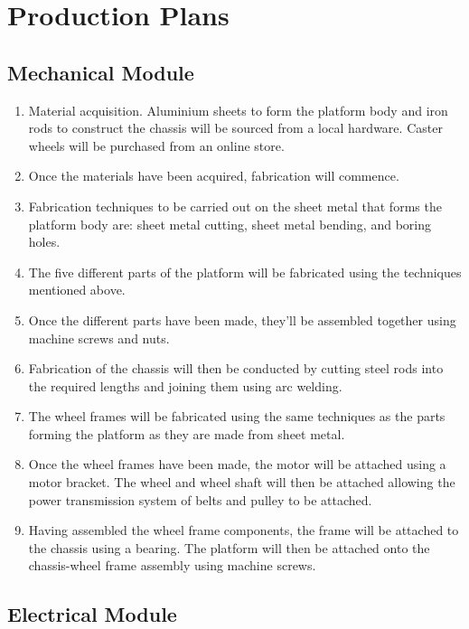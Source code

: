 \section{Production Plans}

\subsection{Mechanical Module}

\begin{enumerate}
    \item Material acquisition. Aluminium sheets to form the platform body and iron rods to construct the chassis will be sourced from a local hardware. Caster wheels will be purchased from an online store.
    \item Once the materials have been acquired, fabrication will commence.
    \item Fabrication techniques to be carried out on the sheet metal that forms the platform body are: sheet metal cutting, sheet metal bending, and boring holes.
    \item The five different parts of the platform will be fabricated using the techniques mentioned above.
    \item Once the different parts have been made, they'll be assembled together using machine screws and nuts.
    \item Fabrication of the chassis will then be conducted by cutting steel rods into the required lengths and joining them using arc welding.
    \item The wheel frames will be fabricated using the same techniques as the parts forming the platform as they are made from sheet metal. 
    \item Once the wheel frames have been made, the motor will be attached using a motor bracket. The wheel and wheel shaft will then be attached allowing the power transmission system of belts and pulley to be attached.
    \item Having assembled the wheel frame components, the frame will be attached to the chassis using a bearing. The platform will then be attached onto the chassis-wheel frame assembly using machine screws.
\end{enumerate}

\subsection{Electrical Module}

